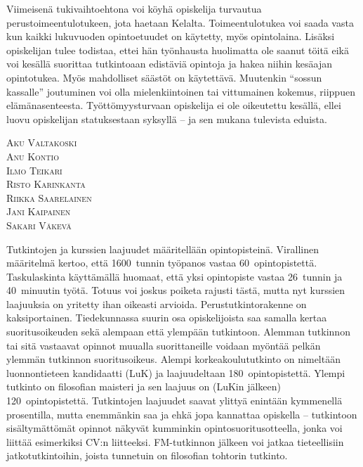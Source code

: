 \documentclass[a5paper, 8pt, twocolumn]{book} %
\numberwithin{equation}{section}
\begin{document}
Viimeisenä tukivaihtoehtona voi köyhä
opiskelija turvautua perus\-toimeen\-tulo\-tukeen, jota haetaan Kelalta.
Toimeentulotukea voi saada
vasta kun kaikki lukuvuoden opintoetuudet on käytetty,
myös opintolaina. Lisäksi opiskelijan tulee todistaa, ettei hän työnhausta huolimatta ole saanut töitä eikä voi kesällä suorittaa tutkintoaan edistäviä opintoja ja hakea niihin kesäajan opintotukea. Myös mahdolliset säästöt on käytettävä. Muutenkin ``sossun kassalle''
joutuminen voi olla mielenkiintoinen
tai vittumainen kokemus, riippuen elämänasenteesta.
Työttömyysturvaan opiskelija
ei ole oikeutettu kesällä, ellei luovu opiskelijan
statuksestaan syksyllä -- ja sen mukana
tulevista eduista.

\vspace{0.5cm}
\noindent\textsc{Aku Valtakoski}\\
\textsc{Anu Kontio}\\
\textsc{Ilmo Teikari}\\
\textsc{Risto Karinkanta}\\
\textsc{Riikka Saarelainen}\\
\textsc{Jani Kaipainen}\\
\textsc{Sakari Väkevä}

Tutkintojen ja kurssien laajuudet määritellään
opintopisteinä. Virallinen määritelmä
kertoo, että 1600~tunnin työpanos
vastaa 60~opintopistettä. Taskulaskinta
käyttämällä huomaat, että yksi opintopiste
vastaa 26~tunnin ja 40~minuutin työtä. Totuus
voi joskus poiketa rajusti tästä, mutta
nyt kurssien laajuuksia on yritetty ihan oikeasti arvioida. Perustutkintorakenne
on kaksiportainen. Tiedekunnassa
suurin osa opiskelijoista saa samalla kertaa
suoritusoikeuden sekä alempaan että
ylempään tutkintoon. Alemman tutkinnon
tai sitä vastaavat opinnot muualla suorittaneille
voidaan myöntää pelkän ylemmän
tutkinnon suoritusoikeus. Alempi korkeakoulututkinto
on nimeltään luonnontieteen
kandidaatti (LuK) ja laajuudeltaan
180~opintopistettä. Ylempi tutkinto on filosofian
maisteri ja sen laajuus on (LuKin
jälkeen) 120~opintopistettä. Tutkintojen laajuudet saavat ylittyä enintään kymmenellä prosentilla, mutta enemmänkin saa ja ehkä jopa kannattaa opiskella -- tutkintoon sisältymättömät opinnot näkyvät kumminkin opinto\-suoritus\-otteella, jonka voi liittää esi\-merkiksi CV:n liitteeksi. FM-tutkinnon jälkeen voi jatkaa tieteellisiin jatkotutkintoihin, joista tunnetuin on filosofian tohtorin tutkinto.
\end{document}
